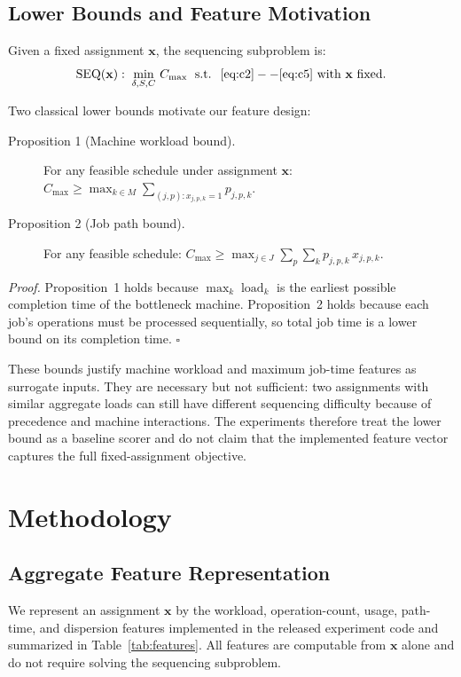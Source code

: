 \documentclass[12pt]{article}
\begin{document}
\subsection{Lower Bounds and Feature Motivation}
Given a fixed assignment $\mathbf{x}$, the sequencing subproblem is:
\begin{equation}
\operatorname{SEQ}(\mathbf{x}):\; \min_{\delta,S,C}\, C_{\max}\;\text{ s.t. }\;\eqref{eq:c2}--\eqref{eq:c5}\text{ with }\mathbf{x}\text{ fixed}. \label{eq:seq}
\end{equation}

Two classical lower bounds motivate our feature design:

\begin{description}
\item[Proposition 1 (Machine workload bound).] For any feasible schedule under assignment $\mathbf{x}$: 
$C_{\max} \geq \max_{k\in M} \sum_{(j,p):x_{j,p,k}=1} p_{j,p,k}$.
\item[Proposition 2 (Job path bound).] For any feasible schedule: 
$C_{\max} \geq \max_{j\in J} \sum_{p} \sum_{k} p_{j,p,k}\,x_{j,p,k}$.
\end{description}

\textit{Proof.} Proposition~1 holds because $\max_k \operatorname{load}_k$ is the earliest possible completion time of the bottleneck machine. Proposition~2 holds because each job's operations must be processed sequentially, so total job time is a lower bound on its completion time. $\square$

These bounds justify machine workload and maximum job-time features as surrogate inputs. They are necessary but not sufficient: two assignments with similar aggregate loads can still have different sequencing difficulty because of precedence and machine interactions. The experiments therefore treat the lower bound as a baseline scorer and do not claim that the implemented feature vector captures the full fixed-assignment objective.

\section{Methodology}

\subsection{Aggregate Feature Representation}
We represent an assignment $\mathbf{x}$ by the workload, operation-count, usage, path-time, and dispersion features implemented in the released experiment code and summarized in Table~\ref{tab:features}. All features are computable from $\mathbf{x}$ alone and do not require solving the sequencing subproblem.
\end{document}

